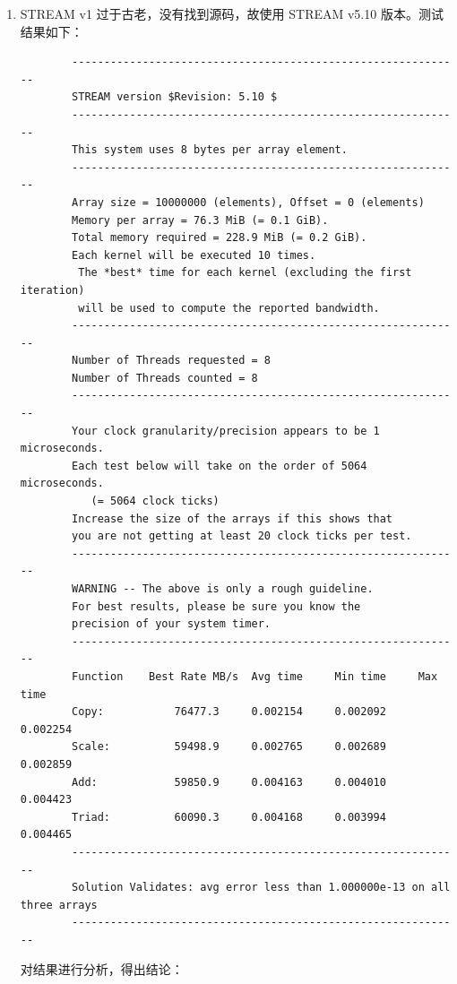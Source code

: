 \documentclass[UTF8]{report}
\begin{document}
\begin{enumerate}[label=(\arabic*)]
    \item STREAM v1 过于古老，没有找到源码，故使用 STREAM v5.10 版本。测试结果如下：
    
    \begin{lstlisting}
        -------------------------------------------------------------
        STREAM version $Revision: 5.10 $
        -------------------------------------------------------------
        This system uses 8 bytes per array element.
        -------------------------------------------------------------
        Array size = 10000000 (elements), Offset = 0 (elements)
        Memory per array = 76.3 MiB (= 0.1 GiB).
        Total memory required = 228.9 MiB (= 0.2 GiB).
        Each kernel will be executed 10 times.
         The *best* time for each kernel (excluding the first iteration)
         will be used to compute the reported bandwidth.
        -------------------------------------------------------------
        Number of Threads requested = 8
        Number of Threads counted = 8
        -------------------------------------------------------------
        Your clock granularity/precision appears to be 1 microseconds.
        Each test below will take on the order of 5064 microseconds.
           (= 5064 clock ticks)
        Increase the size of the arrays if this shows that
        you are not getting at least 20 clock ticks per test.
        -------------------------------------------------------------
        WARNING -- The above is only a rough guideline.
        For best results, please be sure you know the
        precision of your system timer.
        -------------------------------------------------------------
        Function    Best Rate MB/s  Avg time     Min time     Max time
        Copy:           76477.3     0.002154     0.002092     0.002254
        Scale:          59498.9     0.002765     0.002689     0.002859
        Add:            59850.9     0.004163     0.004010     0.004423
        Triad:          60090.3     0.004168     0.003994     0.004465
        -------------------------------------------------------------
        Solution Validates: avg error less than 1.000000e-13 on all three arrays
        -------------------------------------------------------------
    \end{lstlisting}

    对结果进行分析，得出结论：


\end{enumerate}
\end{document}
